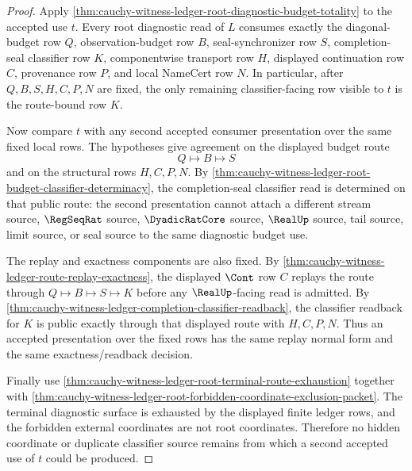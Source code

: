 \begin{proof}
Apply \autoref{thm:cauchy-witness-ledger-root-diagnostic-budget-totality} to the accepted use $t$. Every root diagnostic read of $L$ consumes exactly the diagonal-budget row $Q$, observation-budget row $B$, seal-synchronizer row $S$, completion-seal classifier row $K$, componentwise transport row $H$, displayed continuation row $C$, provenance row $P$, and local NameCert row $N$. In particular, after $Q,B,S,H,C,P,N$ are fixed, the only remaining classifier-facing row visible to $t$ is the route-bound row $K$.

Now compare $t$ with any second accepted consumer presentation over the same fixed local rows. The hypotheses give agreement on the displayed budget route
$$
Q \longmapsto B \longmapsto S
$$
and on the structural rows $H,C,P,N$. By \autoref{thm:cauchy-witness-ledger-root-budget-classifier-determinacy}, the completion-seal classifier read is determined on that public route: the second presentation cannot attach a different stream source, $\RegSeqRat$ source, $\DyadicRatCore$ source, $\RealUp$ source, tail source, limit source, or seal source to the same diagnostic budget use.

The replay and exactness components are also fixed. By \autoref{thm:cauchy-witness-ledger-route-replay-exactness}, the displayed $\Cont$ row $C$ replays the route through $Q \longmapsto B \longmapsto S \longmapsto K$ before any $\RealUp$-facing read is admitted. By \autoref{thm:cauchy-witness-ledger-completion-classifier-readback}, the classifier readback for $K$ is public exactly through that displayed route with $H,C,P,N$. Thus an accepted presentation over the fixed rows has the same replay normal form and the same exactness/readback decision.

Finally use \autoref{thm:cauchy-witness-ledger-root-terminal-route-exhaustion} together with \autoref{thm:cauchy-witness-ledger-root-forbidden-coordinate-exclusion-packet}. The terminal diagnostic surface is exhausted by the displayed finite ledger rows, and the forbidden external coordinates are not root coordinates. Therefore no hidden coordinate or duplicate classifier source remains from which a second accepted use of $t$ could be produced.
\end{proof}
